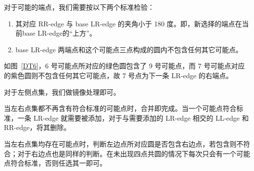 对于可能的端点，我们需要按以下两个标准检验：

\begin{enumerate}
    \item 其对应 RR-edge 与 base LR-edge 的夹角小于 180 度。即，新选择的端点在当前base LR-edge的“上方”。
    \item base LR-edge 两端点和这个可能点三点构成的圆内不包含任何其它可能点。
\end{enumerate}

如图~\ref*{DT6}，6 号可能点所对应的绿色圆包含了 9 号可能点，而 7 号可能点对应的紫色圆则不包含任何其它可能点，故 7 号点为下一条 LR-edge 的右端点。

对于左侧点集，我们做镜像处理即可。

当左右点集都不再含有符合标准的可能点时，合并即完成。当一个可能点符合标准，一条 LR-edge 就需要被添加，对于与需要添加的 LR-edge 相交的 LL-edge 和 RR-edge，将其删除。

当左右点集均存在可能点时，判断左边点所对应圆是否包含右边点，若包含则不符合；对于右边点也是同样的判断。在未出现四点共圆的情况下每次只会有一个可能点符合标准，否则任选其一即可。

